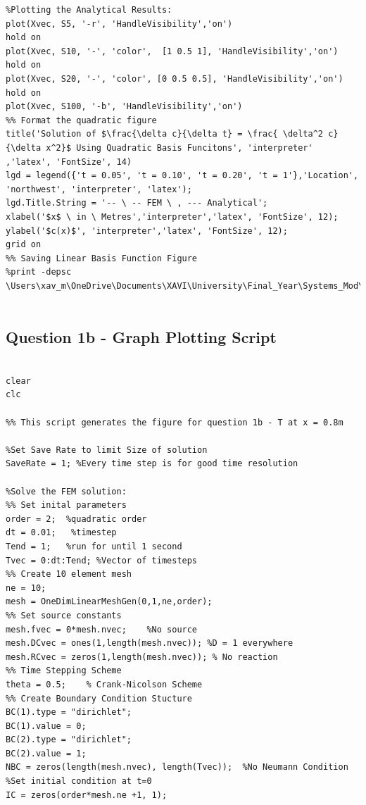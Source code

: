 \documentclass[11pt]{article}
\begin{document}
\begin{appendices}
\begin{lstlisting}
%Plotting the Analytical Results:
plot(Xvec, S5, '-r', 'HandleVisibility','on')
hold on
plot(Xvec, S10, '-', 'color',  [1 0.5 1], 'HandleVisibility','on')
hold on
plot(Xvec, S20, '-', 'color', [0 0.5 0.5], 'HandleVisibility','on')
hold on
plot(Xvec, S100, '-b', 'HandleVisibility','on')
%% Format the quadratic figure
title('Solution of $\frac{\delta c}{\delta t} = \frac{ \delta^2 c}{\delta x^2}$ Using Quadratic Basis Funcitons', 'interpreter' ,'latex', 'FontSize', 14)
lgd = legend({'t = 0.05', 't = 0.10', 't = 0.20', 't = 1'},'Location', 'northwest', 'interpreter', 'latex');
lgd.Title.String = '-- \ -- FEM \ , --- Analytical';
xlabel('$x$ \ in \ Metres','interpreter','latex', 'FontSize', 12);
ylabel('$c(x)$', 'interpreter','latex', 'FontSize', 12);
grid on
%% Saving Linear Basis Function Figure
%print -depsc \Users\xav_m\OneDrive\Documents\XAVI\University\Final_Year\Systems_Mod\Modeling_CW2\Report\Figures\epsQ1aQuad


\end{lstlisting}


\pagebreak
\subsection{Question 1b - Graph Plotting Script}\label{ap:Q1b}

\begin{lstlisting}

clear
clc

%% This script generates the figure for question 1b - T at x = 0.8m

%Set Save Rate to limit Size of solution
SaveRate = 1; %Every time step is for good time resolution

%Solve the FEM solution:
%% Set inital parameters
order = 2;  %quadratic order
dt = 0.01;   %timestep
Tend = 1;   %run for until 1 second
Tvec = 0:dt:Tend; %Vector of timesteps
%% Create 10 element mesh
ne = 10;
mesh = OneDimLinearMeshGen(0,1,ne,order);
%% Set source constants
mesh.fvec = 0*mesh.nvec;    %No source
mesh.DCvec = ones(1,length(mesh.nvec)); %D = 1 everywhere
mesh.RCvec = zeros(1,length(mesh.nvec)); % No reaction
%% Time Stepping Scheme
theta = 0.5;    % Crank-Nicolson Scheme
%% Create Boundary Condition Stucture
BC(1).type = "dirichlet";   
BC(1).value = 0;
BC(2).type = "dirichlet";
BC(2).value = 1;
NBC = zeros(length(mesh.nvec), length(Tvec));  %No Neumann Condition
%Set initial condition at t=0
IC = zeros(order*mesh.ne +1, 1);




\end{lstlisting}
\end{appendices}
\end{document}
